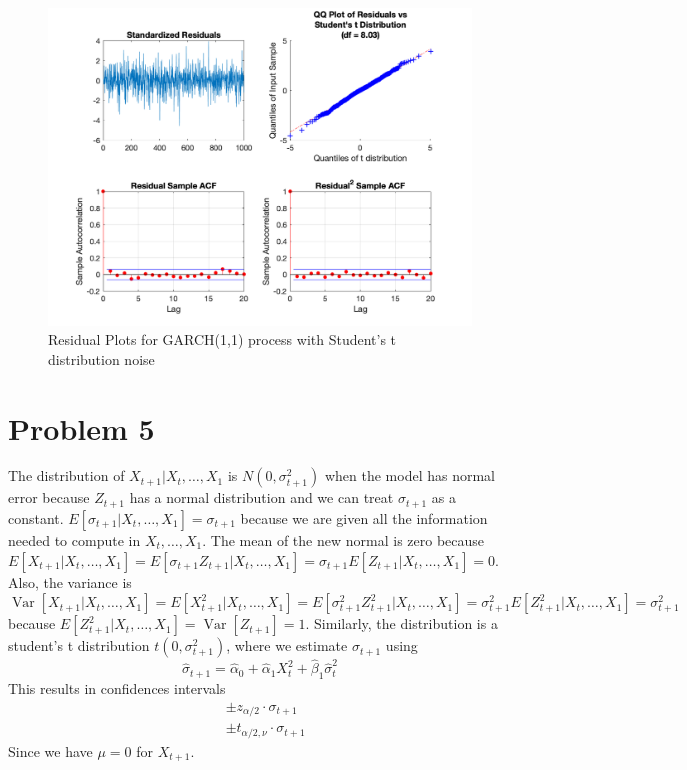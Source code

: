 \documentclass{article}
\DeclareMathOperator{\Var}{Var}
\begin{document}
\begin{figure}[H]
\includegraphics[width=16cm]{plots/residual_plots_t.png}
\centering
\caption{Residual Plots for GARCH(1,1) process with Student's t distribution noise}
\label{fig:residual_plots_t}
\end{figure}

\section*{Problem 5}
The distribution of $X_{t + 1} | X_t, \ldots, X_1$ is $N(0, \sigma_{t+1}^2)$ when the model has normal error because  $Z_{t + 1}$ has a normal distribution and we can treat $\sigma_{t + 1}$ as a constant. $E[\sigma_{t + 1} | X_t, \ldots, X_1] = \sigma_{t + 1}$ because we are given all the information needed to compute in $X_t, \ldots, X_1$.
The mean of the new normal is zero because $E[X_{t + 1} | X_t, \ldots, X_1] = E[\sigma_{t + 1} Z_{t + 1} | X_t, \ldots, X_1] = \sigma_{t + 1} E[Z_{t + 1} | X_t, \ldots, X_1] = 0$.
Also, the variance is $\Var[X_{t + 1} | X_t, \ldots, X_1] = E[X_{t + 1}^2 | X_t, \ldots, X_1] = E[\sigma_{t + 1}^2 Z_{t + 1}^2 | X_t, \ldots, X_1] = \sigma_{t + 1}^2 E[Z_{t + 1}^2 | X_t, \ldots, X_1] = \sigma_{t + 1}^2$ because $E[Z_{t + 1}^2 | X_t, \ldots, X_1] = \Var[Z_{t + 1}] = 1$.
Similarly, the distribution is a student's t distribution $t(0, \sigma_{t + 1}^2)$,
where we estimate $\sigma_{t + 1}$ using
$$
\hat{\sigma}_{t + 1} = \hat{\alpha}_0 + \hat{\alpha}_1 X_t^2 + \hat{\beta}_1 \hat{\sigma}_t^2
$$
This results in confidences intervals
\begin{align*}
&\pm z_{\alpha/2} \cdot \sigma_{t + 1}\\
&\pm t_{\alpha/2, \nu} \cdot \sigma_{t + 1}
\end{align*}
Since we have $\mu = 0$ for $X_{t + 1}$.
\end{document}
